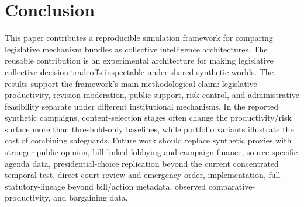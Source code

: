 \documentclass[manuscript]{acmart}
\begin{document}
\section{Conclusion}

This paper contributes a reproducible simulation framework for comparing legislative mechanism bundles as collective intelligence architectures. The reusable contribution is an experimental architecture for making legislative collective decision tradeoffs inspectable under shared synthetic worlds. The results support the framework's main methodological claim: legislative productivity, revision moderation, public support, risk control, and administrative feasibility separate under different institutional mechanisms. In the reported synthetic campaigns, content-selection stages often change the productivity/risk surface more than threshold-only baselines, while portfolio variants illustrate the cost of combining safeguards. Future work should replace synthetic proxies with stronger public-opinion, bill-linked lobbying and campaign-finance, source-specific agenda data, presidential-choice replication beyond the current concentrated temporal test, direct court-review and emergency-order, implementation, full statutory-lineage beyond bill/action metadata, observed comparative-productivity, and bargaining data.



\end{document}
